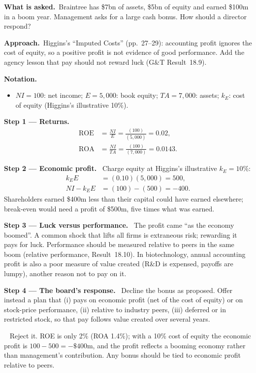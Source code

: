\documentclass[11pt,a4paper]{article}
\newcommand{\notation}{\par\noindent\textbf{Notation.}}
\newcommand{\step}[2]{\par\medskip\noindent\textbf{Step #1 --- #2.}~}
\newcommand{\asked}{\par\medskip\noindent\textbf{What is asked.}~}
\newcommand{\approach}{\par\smallskip\noindent\textbf{Approach.}~}
\newcommand{\answer}[1]{\par\smallskip\noindent\fbox{\textbf{Answer #1.}}~}
\begin{document}
\asked Braintree has \$7bn of assets, \$5bn of equity and earned \$100m in a boom year. Management asks for a large cash bonus. How should a director respond?

\approach Higgins's ``Imputed Costs'' (pp.~27--29): accounting profit ignores the cost of equity, so a positive profit is not evidence of good performance. Add the agency lesson that pay should not reward luck (G\&T Result~18.9).

\notation
\begin{itemize}
  \item $NI=100$: net income; $E=5{,}000$: book equity; $TA=7{,}000$: assets; $k_E$: cost of equity (Higgins's illustrative 10\%).
\end{itemize}

\step{1}{Returns}
\begin{align}
  \mathrm{ROE} &= \frac{NI}{E} = \frac{(100)}{(5{,}000)} = 0.02, \label{r8be4-roe}\\
  \mathrm{ROA} &= \frac{NI}{TA} = \frac{(100)}{(7{,}000)} = 0.0143. \label{r8be4-roa}
\end{align}

\step{2}{Economic profit} Charge equity at Higgins's illustrative $k_E=10\%$:
\begin{align}
  k_E E &= (0.10)(5{,}000) = 500, \label{r8be4-charge}\\
  NI - k_E E &= (100) - (500) = -400. \label{r8be4-ep}
\end{align}
Shareholders earned \$400m less than their capital could have earned elsewhere; break-even would need a profit of \$500m, five times what was earned.

\step{3}{Luck versus performance} The profit came ``as the economy boomed''. A common shock that lifts all firms is extraneous risk; rewarding it pays for luck. Performance should be measured relative to peers in the same boom (relative performance, Result~18.10). In biotechnology, annual accounting profit is also a poor measure of value created (R\&D is expensed, payoffs are lumpy), another reason not to pay on it.

\step{4}{The board's response} Decline the bonus as proposed. Offer instead a plan that (i) pays on economic profit (net of the cost of equity) or on stock-price performance, (ii) relative to industry peers, (iii) deferred or in restricted stock, so that pay follows value created over several years.

\answer{} Reject it. ROE is only 2\% (ROA 1.4\%); with a 10\% cost of equity the economic profit is $100-500=-\$400$m, and the profit reflects a booming economy rather than management's contribution. Any bonus should be tied to economic profit relative to peers.
\end{document}
